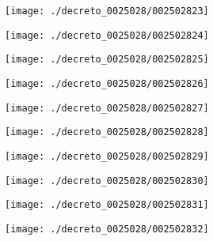 \begin{figure}[!ht]
    \centering
    \texttt{[image: ./decreto\_0025028/002502823]}
\end{figure}
\clearpage

\begin{figure}[!ht]
    \centering
    \texttt{[image: ./decreto\_0025028/002502824]}
\end{figure}
\clearpage

\begin{figure}[!ht]
    \centering
    \texttt{[image: ./decreto\_0025028/002502825]}
\end{figure}
\clearpage

\begin{figure}[!ht]
    \centering
    \texttt{[image: ./decreto\_0025028/002502826]}
\end{figure}
\clearpage

\begin{figure}[!ht]
    \centering
    \texttt{[image: ./decreto\_0025028/002502827]}
\end{figure}
\clearpage

\begin{figure}[!ht]
    \centering
    \texttt{[image: ./decreto\_0025028/002502828]}
\end{figure}
\clearpage

\begin{figure}[!ht]
    \centering
    \texttt{[image: ./decreto\_0025028/002502829]}
\end{figure}
\clearpage

\begin{figure}[!ht]
    \centering
    \texttt{[image: ./decreto\_0025028/002502830]}
\end{figure}
\clearpage

\begin{figure}[!ht]
    \centering
    \texttt{[image: ./decreto\_0025028/002502831]}
\end{figure}
\clearpage

\begin{figure}[!ht]
    \centering
    \texttt{[image: ./decreto\_0025028/002502832]}
\end{figure}
\clearpage
